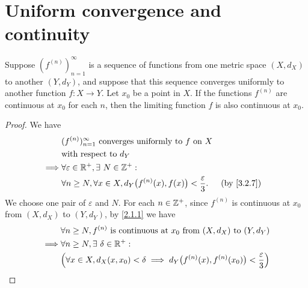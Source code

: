 \section{Uniform convergence and continuity}\label{sec:3.3}

\begin{thm}\label{3.3.1}
  Suppose \((f^{(n)})_{n = 1}^\infty\) is a sequence of functions from one metric space \((X, d_X)\) to another \((Y, d_Y)\), and suppose that this sequence converges uniformly to another function \(f : X \to Y\).
  Let \(x_0\) be a point in \(X\).
  If the functions \(f^{(n)}\) are continuous at \(x_0\) for each \(n\), then the limiting function \(f\) is also continuous at \(x_0\).
\end{thm}

\begin{proof}
  We have
  \begin{align*}
             & (f^{(n)})_{n = 1}^\infty \text{ converges uniformly to } f \text{ on } X                                   \\
             & \text{with respect to } d_Y                                                                                \\
    \implies & \forall \varepsilon \in \R^+, \exists\ N \in \Z^+ :                                                        \\
             & \forall n \geq N, \forall x \in X, d_Y\big(f^{(n)}(x), f(x)\big) < \dfrac{\varepsilon}{3}. &  & \by{3.2.7}
  \end{align*}
  We choose one pair of \(\varepsilon\) and \(N\).
  For each \(n \in \mathbb{Z}^+\), since \(f^{(n)}\) is continuous at \(x_0\) from \((X, d_X)\) to \((Y, d_Y)\), by \cref{2.1.1} we have
  \begin{align*}
             & \forall n \geq N, f^{(n)} \text{ is continuous at } x_0 \text{ from } (X, d_X) \text{ to } (Y, d_Y)                                                                                            \\
    \implies & \forall n \geq N, \exists\ \delta \in \R^+ :                                                                                                                                                   \\
             & \Big(\forall x \in X, d_X(x, x_0) < \delta \implies d_Y\big(f^{(n)}(x), f^{(n)}(x_0)\big) < \dfrac{\varepsilon}{3}\Big)                                                                        \\

\end{align*}
\end{proof}
